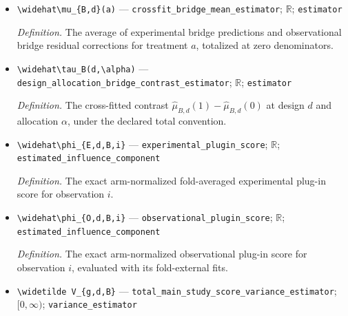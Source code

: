 \documentclass{article}
\begin{document}
\begin{itemize}
  \par\smallskip\noindent\emph{Definition.} The experimental arm mean of the fold-\(\ell\) outcome-bridge fit, with zero-denominator value zero.
  \item \texttt{\textbackslash{}\allowbreak{}widehat\textbackslash{}\allowbreak{}mu\_\allowbreak{}\{B,\allowbreak{}d\}\allowbreak{}(a)} --- \texttt{crossfit\_\allowbreak{}bridge\_\allowbreak{}mean\_\allowbreak{}estimator}; \(\mathbb R\); \texttt{estimator}
  \par\smallskip\noindent\emph{Definition.} The average of experimental bridge predictions and observational bridge residual corrections for treatment \(a\), totalized at zero denominators.
  \item \texttt{\textbackslash{}\allowbreak{}widehat\textbackslash{}\allowbreak{}tau\_\allowbreak{}B(d,\allowbreak{}\textbackslash{}\allowbreak{}alpha)} --- \texttt{design\_\allowbreak{}allocation\_\allowbreak{}bridge\_\allowbreak{}contrast\_\allowbreak{}estimator}; \(\mathbb R\); \texttt{estimator}
  \par\smallskip\noindent\emph{Definition.} The cross-fitted contrast \(\widehat\mu_{B,d}(1)-\widehat\mu_{B,d}(0)\) at design \(d\) and allocation \(\alpha\), under the declared total convention.
  \item \texttt{\textbackslash{}\allowbreak{}widehat\textbackslash{}\allowbreak{}phi\_\allowbreak{}\{E,\allowbreak{}d,\allowbreak{}B,\allowbreak{}i\}\allowbreak{}} --- \texttt{experimental\_\allowbreak{}plugin\_\allowbreak{}score}; \(\mathbb R\); \texttt{estimated\_\allowbreak{}influence\_\allowbreak{}component}
  \par\smallskip\noindent\emph{Definition.} The exact arm-normalized fold-averaged experimental plug-in score for observation \(i\).
  \item \texttt{\textbackslash{}\allowbreak{}widehat\textbackslash{}\allowbreak{}phi\_\allowbreak{}\{O,\allowbreak{}d,\allowbreak{}B,\allowbreak{}i\}\allowbreak{}} --- \texttt{observational\_\allowbreak{}plugin\_\allowbreak{}score}; \(\mathbb R\); \texttt{estimated\_\allowbreak{}influence\_\allowbreak{}component}
  \par\smallskip\noindent\emph{Definition.} The exact arm-normalized observational plug-in score for observation \(i\), evaluated with its fold-external fits.
  \item \texttt{\textbackslash{}\allowbreak{}widetilde V\_\allowbreak{}\{g,\allowbreak{}d,\allowbreak{}B\}\allowbreak{}} --- \texttt{total\_\allowbreak{}main\_\allowbreak{}study\_\allowbreak{}score\_\allowbreak{}variance\_\allowbreak{}estimator}; \([0,\infty)\); \texttt{variance\_\allowbreak{}estimator}

\end{itemize}
\end{document}
